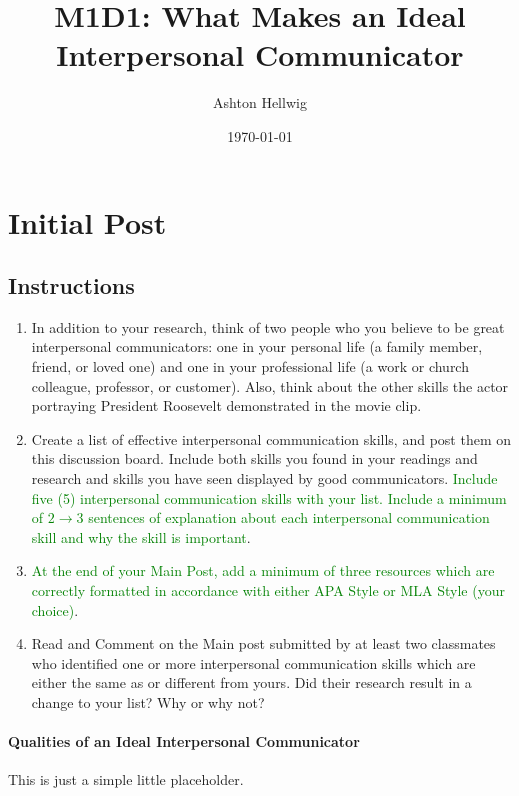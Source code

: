 \documentclass[stu,12pt]{apa7}
\title{%
    M1D1: What Makes an Ideal Interpersonal Communicator
  }
\author{Ashton Hellwig}
\date{\today}
\begin{document}
  \maketitle

  \section{Initial Post}
    \subsection*{Instructions}
      \begin{enumerate}
        \item In addition to your research, think of two people who you believe
          to be great interpersonal communicators: one in your personal life (a
          family member, friend, or loved one) and one in your professional life
          (a work or church colleague, professor, or customer). Also, think
          about the other skills the actor portraying President Roosevelt
          demonstrated in the movie clip.
        \item Create a list of effective interpersonal communication skills, and
          post them on this discussion board. Include both skills you found in
          your readings and research and skills you have seen displayed by good
          communicators. \textcolor{green}{Include five (5) interpersonal
          communication skills with your list. Include a minimum of
          \(2\rightarrow 3\) sentences of explanation about each interpersonal
          communication skill and why the skill is important}.
        \item \textcolor{green}{At the end of your Main Post, add a minimum
          of three resources which are correctly formatted in accordance with
          either APA Style or MLA Style (your choice)}.
        \item Read and Comment on the Main post submitted by at least two
          classmates who identified one or more interpersonal communication
          skills which are either the same as or different from yours. Did their
          research result in a change to your list? Why or why not?
      \end{enumerate}

    \newpage
    \paragraph{Qualities of an Ideal Interpersonal Communicator}
      This is just a simple little placeholder.
\end{document}
